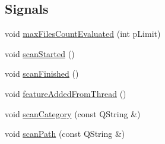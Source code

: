\subsection*{Signals}
\begin{DoxyCompactItemize}
\item 
void \hyperlink{class_u_b_features_controller_aecef1f7aa275d49a8c29b65b931c9b3f}{max\-Files\-Count\-Evaluated} (int p\-Limit)
\item 
void \hyperlink{class_u_b_features_controller_a3a4888ce760ec446d39758f08a55f408}{scan\-Started} ()
\item 
void \hyperlink{class_u_b_features_controller_ad9dc411ac8ff3afaf4cbfddbc10a507c}{scan\-Finished} ()
\item 
void \hyperlink{class_u_b_features_controller_a6d1921b5aab49c5c2f354eb55eeda3f1}{feature\-Added\-From\-Thread} ()
\item 
void \hyperlink{class_u_b_features_controller_a1144dedb4b331da981b249c8178dd925}{scan\-Category} (const Q\-String \&)
\item 
void \hyperlink{class_u_b_features_controller_ac58f7f5d1126b923f35832bfa958c55d}{scan\-Path} (const Q\-String \&)
\end{DoxyCompactItemize}
